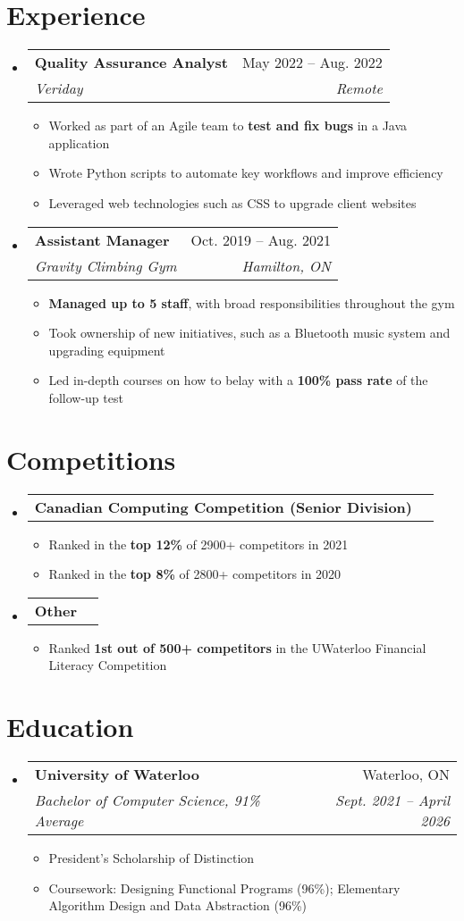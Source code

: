 \documentclass[letterpaper,11pt]{article}
\makeatletter
\newcommand{\resumeItem}[1]{
	\item\small{
		{#1 \vspace{-2pt}}
	}
}
\newcommand{\resumeSubheading}[4]{
	\vspace{-2pt}\item
		\begin{tabular*}{0.97\textwidth}[t]{l@{\extracolsep{\fill}}r}
			\textbf{#1} & #2 \\
			\textit{\small#3} & \textit{\small #4} \\
		\end{tabular*}\vspace{-7pt}
}
\newcommand{\resumeProjectHeading}[2]{
    \item
    \begin{tabular*}{0.97\textwidth}{l@{\extracolsep{\fill}}r}
      \small#1 & #2 \\
    \end{tabular*}\vspace{-7pt}
}
\newcommand{\resumeSubHeadingListStart}{\begin{itemize}[leftmargin=0.15in, label={}]}
\newcommand{\resumeSubHeadingListEnd}{\end{itemize}}
\newcommand{\resumeItemListStart}{\begin{itemize}}
\newcommand{\resumeItemListEnd}{\end{itemize}\vspace{-5pt}}
\makeatother
\begin{document}
\section{Experience}
\resumeSubHeadingListStart
	\resumeSubheading
		{Quality Assurance Analyst}{May 2022 -- Aug. 2022}
		{Veriday}{Remote}
		\resumeItemListStart
			\resumeItem{Worked as part of an Agile team to \textbf{test and fix bugs} in a Java application}
			\resumeItem{Wrote Python scripts to automate key workflows and improve efficiency}
			\resumeItem{Leveraged web technologies such as CSS to upgrade client websites}
		\resumeItemListEnd
	\resumeSubheading
		{Assistant Manager}{Oct. 2019 -- Aug. 2021}
		{Gravity Climbing Gym}{Hamilton, ON}
		\resumeItemListStart
			\resumeItem{\textbf{Managed up to 5 staff}, with broad responsibilities throughout the gym}
			\resumeItem{Took ownership of new initiatives, such as a Bluetooth music system and upgrading equipment}
			\resumeItem{Led in-depth courses on how to belay with a \textbf{100\% pass rate} of the follow-up test}
		\resumeItemListEnd
\resumeSubHeadingListEnd


\section{Competitions}
\resumeSubHeadingListStart
	\resumeProjectHeading
		{\textbf{Canadian Computing Competition (Senior Division)}}{}
		\resumeItemListStart
			\resumeItem{Ranked in the \textbf{top 12\%} of 2900+ competitors in 2021}
			\resumeItem{Ranked in the \textbf{top 8\%} of 2800+ competitors in 2020}
		\resumeItemListEnd
	\resumeProjectHeading
		{\textbf{Other}}{}
		\resumeItemListStart
			\resumeItem{Ranked \textbf{1st out of 500+ competitors} in the UWaterloo Financial Literacy Competition}
		\resumeItemListEnd
\resumeSubHeadingListEnd


\section{Education}
\resumeSubHeadingListStart
	\resumeSubheading
		{University of Waterloo}{Waterloo, ON}
		{Bachelor of Computer Science, 91\% Average}{Sept. 2021 -- April 2026}
	\resumeItemListStart
		\resumeItem{President's Scholarship of Distinction}
		\resumeItem{Coursework: Designing Functional Programs (96\%); Elementary Algorithm Design and Data Abstraction (96\%) }
	\resumeItemListEnd
\resumeSubHeadingListEnd
\end{document}
